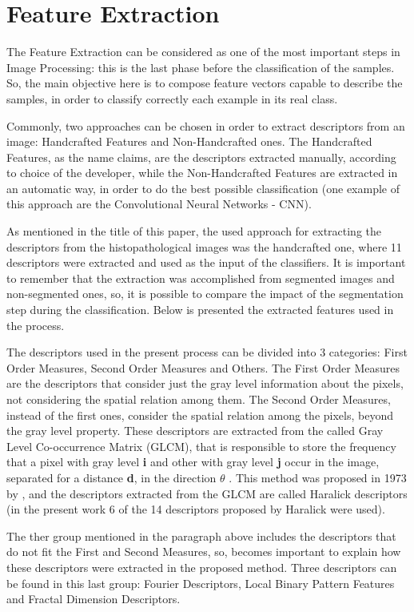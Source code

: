 \documentclass[conference]{IEEEtran}
\begin{document}
\section{Feature Extraction}
The Feature Extraction can be considered as one of the most important steps in Image Processing: this is the last phase before the classification of the samples. So, the main objective here is to compose feature vectors capable to describe the samples, in order to classify correctly each example in its real class.\par
Commonly, two approaches can be chosen in order to extract descriptors from an image: Handcrafted Features and Non-Handcrafted ones. The Handcrafted Features, as the name claims, are the descriptors extracted manually, according to choice of the developer, while the Non-Handcrafted Features are extracted in an automatic way, in order to do the best possible classification (one example of this approach are the Convolutional Neural Networks - CNN). \par
As mentioned in the title of this paper, the used approach for extracting the descriptors from the histopathological images was the handcrafted one, where 11 descriptors were extracted and used as the input of the classifiers. It is important to remember that the extraction was accomplished from segmented images and non-segmented ones, so, it is possible to compare the impact of the segmentation step during the classification. Below is presented the extracted features used in the process.\par
The descriptors used in the present process can be divided into 3 categories: First Order Measures, Second Order Measures and Others. The First Order Measures are the descriptors that consider just the gray level information about the pixels, not considering the spatial relation among them. The Second Order Measures, instead of the first ones, consider the spatial relation among the pixels, beyond the gray level property. These descriptors are extracted from the called Gray Level Co-occurrence Matrix (GLCM), that is responsible to store the frequency that a pixel with gray level \textbf{i} and other with gray level \textbf{j} occur in the image, separated for a distance \textbf{d}, in the direction\textbf{ $\theta$} \cite{conci2008computacao}. This method was proposed in 1973 by \cite{haralick:smc1973}, and the descriptors extracted from the GLCM are called Haralick descriptors (in the present work 6 of the 14 descriptors proposed by Haralick were used).\par
The ther group mentioned in the paragraph above includes the descriptors that do not fit the First and Second Measures, so, becomes important to explain how these descriptors were extracted in the proposed method. Three descriptors can be found in this last group: Fourier Descriptors, Local Binary Pattern Features and Fractal Dimension Descriptors. \par
\end{document}

